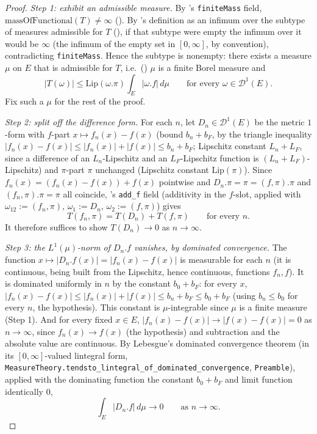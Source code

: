 \begin{proof}
  \emph{Step 1: exhibit an admissible measure.} By 's \texttt{finiteMass}
  field, $\mathrm{massOfFunctional}(T) \ne \infty$ (). By
  's definition as an infimum over the subtype of measures admissible for
  $T$ (), if that subtype were empty the infimum over it would be $\infty$
  (the infimum of the empty set in $[0,\infty]$, by convention), contradicting
  \texttt{finiteMass}. Hence the subtype is nonempty: there exists a measure $\mu$ on $E$ that is
  admissible for $T$, i.e.\ () $\mu$ is a finite Borel measure and
  \[
    |T(\omega)| \le \mathrm{Lip}(\omega.\pi) \int_E |\omega.f| \, d\mu
    \qquad \text{for every } \omega \in \mathcal{D}^1(E)
    . \tag{$\ast$}
  \]
  Fix such a $\mu$ for the rest of the proof.

  \emph{Step 2: split off the difference form.} For each $n$, let $D_n \in \mathcal{D}^1(E)$ be the
  metric $1$-form with $f$-part $x \mapsto f_n(x) - f(x)$ (bound $b_n + b_F$, by the triangle
  inequality $|f_n(x)-f(x)| \le |f_n(x)|+|f(x)| \le b_n+b_F$; Lipschitz constant $L_n+L_F$, since a
  difference of an $L_n$-Lipschitz and an $L_F$-Lipschitz function is $(L_n+L_F)$-Lipschitz) and
  $\pi$-part $\pi$ unchanged (Lipschitz constant $\mathrm{Lip}(\pi)$). Since $f_n(x) = (f_n(x)-
  f(x)) + f(x)$ pointwise and $D_n.\pi = \pi = (f,\pi).\pi$ and $(f_n,\pi).\pi = \pi$ all coincide,
  's \texttt{add\_f} field (additivity in the $f$-slot, applied with
  $\omega_{12} := (f_n,\pi)$, $\omega_1 := D_n$, $\omega_2 := (f,\pi)$) gives
  \[
    T(f_n,\pi) = T(D_n) + T(f,\pi)
    \qquad \text{for every } n
    . \tag{$\ast\ast$}
  \]
  It therefore suffices to show $T(D_n) \to 0$ as $n \to \infty$.

  \emph{Step 3: the $L^1(\mu)$-norm of $D_n.f$ vanishes, by dominated convergence.} The function
  $x \mapsto |D_n.f(x)| = |f_n(x)-f(x)|$ is measurable for each $n$ (it is continuous, being built
  from the Lipschitz, hence continuous, functions $f_n,f$). It is dominated uniformly in $n$ by the
  constant $b_0+b_F$: for every $x$, $|f_n(x)-f(x)| \le |f_n(x)|+|f(x)| \le b_n+b_F \le b_0+b_F$
  (using $b_n \le b_0$ for every $n$, the hypothesis). This constant is $\mu$-integrable since $\mu$
  is a finite measure (Step 1). And for every fixed $x \in E$, $|f_n(x)-f(x)| \to |f(x)-f(x)| = 0$
  as $n \to \infty$, since $f_n(x) \to f(x)$ (the hypothesis) and subtraction and the absolute value
  are continuous. By Lebesgue's dominated convergence theorem (in its $[0,\infty]$-valued lintegral
  form, \texttt{MeasureTheory.tendsto\_lintegral\_of\_dominated\_convergence}, \texttt{Preamble}),
  applied with the dominating function the constant $b_0+b_F$ and limit function identically $0$,
  \[
    \int_E |D_n.f| \, d\mu \longrightarrow 0 \qquad \text{as } n \to \infty
    . \tag{$\dagger$}
  \]


\end{proof}
